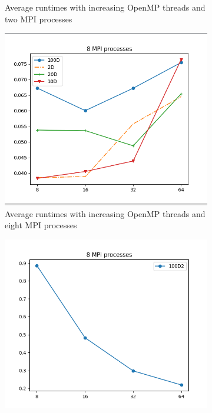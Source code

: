 \documentclass{article}
\begin{document}
\begin{figure}[p]
\begin{subfigure}{0.40\textwidth}
        \caption{Average runtimes with increasing OpenMP threads and two MPI processes}
        \label{fig:image2}
    \end{subfigure}
    \begin{subfigure}{0.40\textwidth}
        \includegraphics[width=\textwidth]{png/8MPIprocesses-smallTestFiles.png}
        \caption{Average runtimes with increasing OpenMP threads and eight MPI processes}
        \label{fig:image3}
    \end{subfigure}
    \begin{subfigure}{0.40\textwidth}
        \includegraphics[width=\textwidth]{png/8MPIprocesses-bigTestFile.png}

\end{subfigure}
\end{figure}
\end{document}
